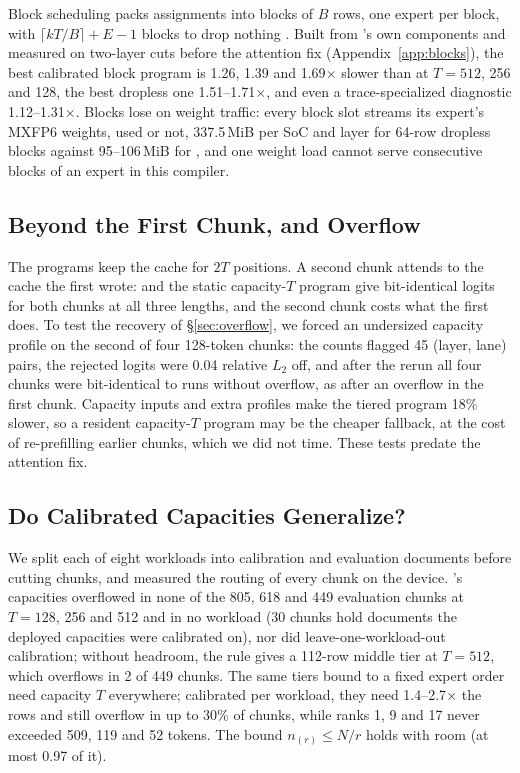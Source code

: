 Block scheduling packs assignments into blocks of $B$ rows, one expert per block, with $\lceil kT/B\rceil+E-1$ blocks to
drop nothing \citep{awsneuronmoe}. Built from \sys's own components and measured on two-layer cuts before the attention fix
(Appendix~\ref{app:blocks}), the best calibrated block program is 1.26, 1.39 and
1.69$\times$ slower than \sys at $T=512$, 256 and 128, the best dropless one 1.51--1.71$\times$, and even a
trace-specialized diagnostic 1.12--1.31$\times$. Blocks lose on weight traffic: every block slot streams its expert's MXFP6
weights, used or not, 337.5\,MiB per SoC and layer for 64-row dropless blocks against 95--106\,MiB for \sys, and one weight
load cannot serve consecutive blocks of an expert in this compiler.

\subsection{Beyond the First Chunk, and Overflow}
\label{sec:eval-chunks}

The programs keep the cache for $2T$ positions. A second chunk attends to the cache the first wrote: \sys and the static
capacity-$T$ program give bit-identical logits for both chunks at all three lengths, and the second chunk costs what the
first does. To test the recovery of \S\ref{sec:overflow}, we forced an undersized capacity profile on the second of four
128-token chunks: the counts flagged 45 (layer, lane) pairs, the rejected logits were 0.04 relative $L_2$ off, and after
the rerun all four chunks were bit-identical to runs without overflow, as after an overflow in the first chunk. Capacity
inputs and extra profiles make the tiered program 18\% slower, so a resident capacity-$T$ program may be the cheaper
fallback, at the cost of re-prefilling earlier chunks, which we did not time. These tests predate the attention fix.

\subsection{Do Calibrated Capacities Generalize?}
\label{sec:eval-gen}

We split each of eight workloads into calibration and evaluation documents before cutting chunks, and measured the routing
of every chunk on the device. \sys's capacities overflowed in none of the 805, 618 and 449 evaluation chunks at $T=128$, 256
and 512 and in no workload (30 chunks hold documents the deployed capacities were calibrated on), nor did
leave-one-workload-out calibration; without headroom, the rule gives a 112-row middle tier at $T=512$, which overflows in 2
of 449 chunks. The same tiers bound to a fixed expert order need capacity $T$ everywhere; calibrated per workload, they need
1.4--2.7$\times$ the rows and still overflow in up to 30\% of chunks, while ranks 1, 9 and 17 never exceeded 509, 119 and 52
tokens. The bound $n_{(r)}\le N/r$ holds with room (at most 0.97 of it).

